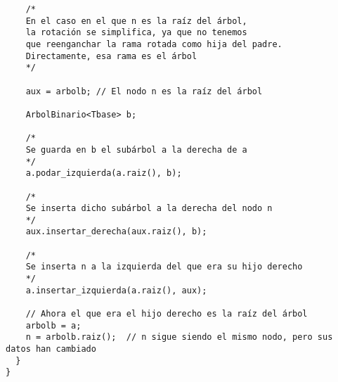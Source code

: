 \documentclass{article}
\begin{document}
\begin{verbatim}
    /*
    En el caso en el que n es la raíz del árbol,
    la rotación se simplifica, ya que no tenemos
    que reenganchar la rama rotada como hija del padre.
    Directamente, esa rama es el árbol
    */

    aux = arbolb; // El nodo n es la raíz del árbol
    
    ArbolBinario<Tbase> b;

    /*
    Se guarda en b el subárbol a la derecha de a
    */
    a.podar_izquierda(a.raiz(), b);

    /*
    Se inserta dicho subárbol a la derecha del nodo n
    */
    aux.insertar_derecha(aux.raiz(), b);

    /*
    Se inserta n a la izquierda del que era su hijo derecho
    */
    a.insertar_izquierda(a.raiz(), aux);

    // Ahora el que era el hijo derecho es la raíz del árbol
    arbolb = a;
    n = arbolb.raiz();  // n sigue siendo el mismo nodo, pero sus datos han cambiado
  }
}
\end{verbatim}
\end{document}
